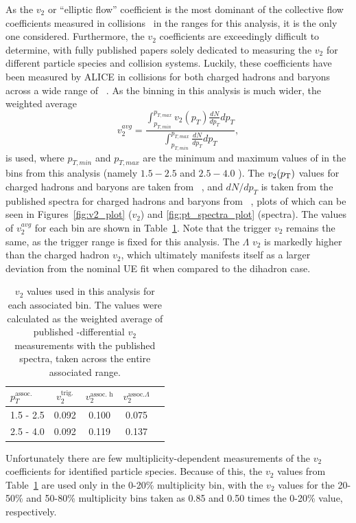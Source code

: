 As the $v_{2}$ or ``elliptic flow'' coefficient is the most dominant of the collective flow coefficients measured in \pPb collisions~\cite{Justin111} in the \pt ranges for this analysis, it is the only one considered. Furthermore, the $v_{2}$ coefficients are exceedingly difficult to determine, with fully published papers solely dedicated to measuring the $v_{2}$ for different particle species and collision systems. Luckily, these coefficients have been measured by ALICE in \pPb collisions for both charged hadrons and \lmb baryons across a wide range of \pt~\cite{ALICEv2_1, ALICEv2_2}. As the \pt binning in this analysis is much wider, the weighted average 
%
\begin{equation}
    \label{eq:v2_weighted_average}
    v_{2}^{avg} = \frac{\int_{p_{T, min}}^{p_{T, max}}v_{2}(p_{T})\frac{dN}{dp_{T}}dp_{T}}{\int_{p_{T, min}}^{p_{T, max}}\frac{dN}{dp_{T}}dp_{T}},
\end{equation}
%
is used, where $p_{T, min}$ and $p_{T, max}$ are the minimum and maximum values of \pt in the bins from this analysis (namely $1.5 - 2.5$ and $2.5 - 4.0$ \GeVc). The $v_{2}(p_{\text{T}})$ values for charged hadrons and \lmb baryons are taken from ~\cite{ALICEv2_1}, and $dN/dp_{T}$ is taken from the published \pt spectra for charged hadrons and \lmb baryons from ~\cite{ALICEpPbEnhancement}, plots of which can be seen in Figures~\ref{fig:v2_plot} ($v_{2}$) and \ref{fig:pt_spectra_plot} (\pt spectra). The values of $v_{2}^{avg}$ for each \pt bin are shown in Table~\ref{tab:v2_values}. Note that the trigger $v_{2}$ remains the same, as the trigger \pt range is fixed for this analysis. The $\Lambda$ $v_{2}$ is markedly higher than the charged hadron $v_{2}$, which ultimately manifests itself as a larger deviation from the nominal UE fit when compared to the dihadron case.
%
\begin{table}[t]
    \centering
    \caption{$v_{2}$ values used in this analysis for each associated \pt bin. The values were calculated as the weighted average of published \pt-differential $v_{2}$ measurements with the published \pt spectra, taken across the entire associated \pt range.}
    \label{tab:v2_values}
    \begin{tabular}{ l c c c c }
    \hline
    $p_{T}^{\text{assoc.}}$ & $v_{2}^{\text{trig.}}$ & $v_{2}^{\text{assoc. h}}$ & $v_{2}^{\text{assoc.} \Lambda}$ \\
    \hline
    1.5 - 2.5 & 0.092 & 0.100 & 0.075 \\
    2.5 - 4.0 & 0.092 & 0.119 & 0.137 \\
    \hline
    \end{tabular}
\end{table}
%
Unfortunately there are few multiplicity-dependent measurements of the $v_{2}$ coefficients for identified particle species. Because of this, the $v_{2}$ values from Table~\ref{tab:v2_values} are used only in the 0-20\% multiplicity bin, with the $v_{2}$ values for the 20-50\% and 50-80\% multiplicity bins taken as 0.85 and 0.50 times the 0-20\% value, respectively.

